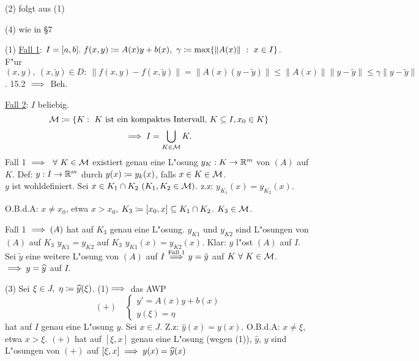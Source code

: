 \documentclass[a4paper,twoside,DIV15,BCOR12mm]{scrbook}
\begin{document}
\begin{beweis}[von 16.1]
\begin{liste}
\item[(2)] folgt aus (1)
\item[(4)] wie in §7
\item[(1)] \underline{Fall 1}: $I=[a,b].\ f(x,y)\da A(x)y+b(x),\ \gamma\da \max\{\|A(x)\|\ :\ x\in I\}$.\\
F"ur $(x,y),\ (x,\tilde{y})\in D:\ \|f(x,y)-f(x,\tilde{y})\|=\|A(x)(y-\tilde{y})\|\le\|A(x)\|\|y-\tilde{y}\|\le\gamma\|y-\tilde{y}\|$.
15.2 $\implies$ Beh.

\underline{Fall 2}: $I$ beliebig.
\[
	\MM\da \{K:\ K\text{ ist ein kompaktes Intervall, }K\subseteq I, x_0\in K\}
\]
\[
	\implies I=\bigcup_{K\in\mathcal{M}}K.
\]
Fall 1 $\implies\ \forall\ K\in\mathcal{M}$ existiert genau eine L"osung $y_K:K\to\mathbb{R}^m$ von $(A)$ auf $K$. Def: $y:I\to\mathbb{R}^m$ durch $y(x)\da y_k(x)$, falls
$x\in K\in\mathcal{M}$.\\
$y$ ist wohldefiniert. Sei $x\in K_1\cap K_2\ (K_1, K_2\in\MM)$. z.z: $y_{K_1}(x)=y_{K_2}(x)$.

O.B.d.A: $x\ne x_0$, etwa $x>x_0$, $K_3\da [x_0,x]\subseteq K_1\cap K_2$.
$K_3\in\mathcal{M}$.

Fall 1 $\implies (A)$ hat auf $K_3$ genau eine L"osung. $y_{K1}$ und $y_{K2}$ sind L"osungen von $(A)$ auf $K_3$ \folgt $y_{K1}=y_{K2}$ auf $K_3$
\folgt $y_{K1}(x)=y_{K2}(x)$. Klar: $y$ l"ost $(A)$ auf $I$. Sei $\tilde{y}$ eine weitere L"osung von $(A)$ auf $I \overset{\text{Fall 1}}{\implies}y=\tilde{y}$ auf $K\ \forall\ K\in\MM$. $\implies y=\widehat{y}$ auf $I$.
\item[(3)]Sei $\xi\in J,\ \eta\da \widehat{y}(\xi)$. (1)$\implies$ das AWP 
\[
	(+)\quad\begin{cases}
		y'=A(x)y+b(x)\\
		y(\xi)=\eta
	\end{cases}
\]
hat auf $I$ genau eine L"osung $y$. Sei $x\in J$. Z.z: $\widehat{y}(x)=y(x)$. O.B.d.A: $x\ne\xi$, etwa $x>\xi$. $(+)$ hat auf $[\xi,x]$ genau eine L"osung (wegen (1)), $\widehat{y}$, $y$ sind L"osungen von $(+)$ auf $[\xi,x]\implies y(x)=\widehat{y}(x)$
\end{liste}
\end{beweis}
\end{document}
